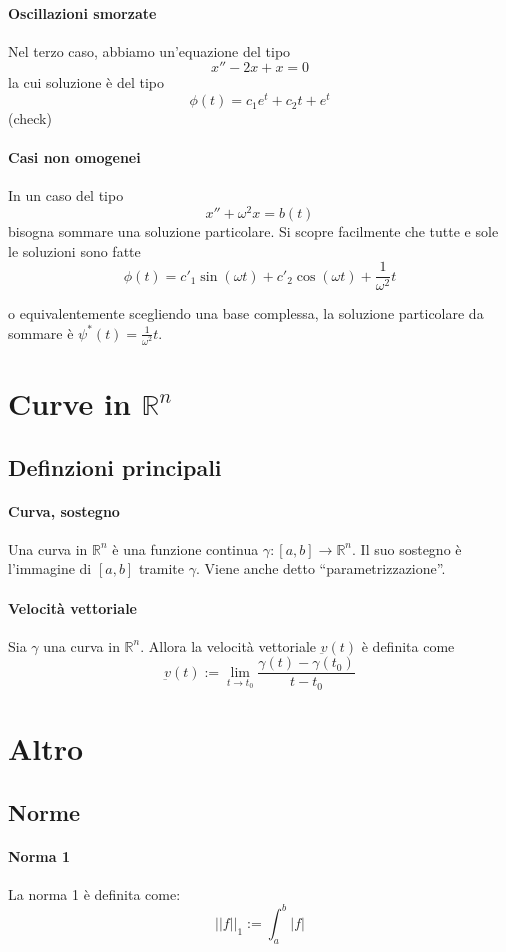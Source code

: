 \documentclass[a4paper,12pt]{article}
\begin{document}
\paragraph{Oscillazioni smorzate}
Nel terzo caso, abbiamo un'equazione del tipo
$$x''-2x +x=0$$
la cui soluzione è del tipo
$$\phi(t) = c_1e^t +c_2 t + e^t$$
(check)

\paragraph{Casi non omogenei}
In un caso del tipo
$$x''+\omega^2 x=b(t)$$
bisogna sommare una soluzione particolare. Si scopre facilmente che tutte e sole le soluzioni sono fatte
$$\phi(t) = c'_1\sin(\omega t) + c'_2\cos(\omega t) + \frac{1}{\omega^2}t$$

o equivalentemente scegliendo una base complessa, la soluzione particolare da sommare è $\psi^*(t) = \frac{1}{\omega^2}t$.

\section{Curve in $\mathbb{R}^n$}
\subsection{Definzioni principali}
\paragraph{Curva, sostegno}
Una curva in $\mathbb{R}^n$ è una funzione continua $\gamma:[a,b]\rightarrow\mathbb{R}^n$.
Il suo sostegno è l'immagine di $[a,b]$ tramite $\gamma$. Viene anche detto ``parametrizzazione''.
\paragraph{Velocità vettoriale}
Sia $\gamma$ una curva in $\mathbb{R}^n$. Allora la velocità vettoriale $\underbar{v}(t)$ è definita come
$$\underbar{v}(t) := \lim_{t\to t_0} \dfrac{\gamma(t)-\gamma(t_0)}{t-t_0}$$


\section{Altro}
\subsection{Norme}
\paragraph{Norma 1}
La norma 1 è definita come:
$$||f||_1 := \int_a^b|f|$$
\end{document}
